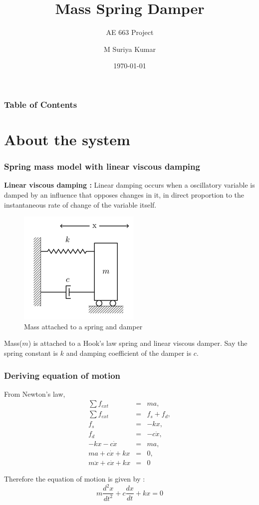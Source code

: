 \documentclass[10pt]{beamer}
\title{Mass Spring Damper}
\subtitle{AE 663 Project}
\institute{Indian Institute of Technology Bombay}
\author{M Suriya Kumar}
\date{\today}
\begin{document}
\begin{frame}[plain]
\maketitle
\end{frame}

\begin{frame}
\frametitle{Table of Contents}
\tableofcontents 
\end{frame}

\section{About the system}

\begin{frame}
\frametitle{Spring mass model with linear viscous damping}
\textbf{Linear viscous damping\cite{wiki} :} Linear damping occurs when a oscillatory variable is damped 
by an influence that opposes changes in it, in direct proportion to the instantaneous rate of change 
of the variable itself.

\begin{figure}[h]
\includegraphics[scale=0.5]{spring_mass_damper.png}
\caption{Mass attached to a spring and damper}
\centering
\end{figure}

Mass($m$) is attached to a Hook's law spring and linear viscous damper. Say the spring constant 
is $k$ and damping coefficient of the damper is $c$.
\end{frame}

\begin{frame}
\frametitle{Deriving equation of motion}
From Newton's law, 
\begin{eqnarray*}
\sum f_{ext} &=& ma, \\
\sum f_{ext} &=& f_s + f_d, \\
f_s &=& -kx, 	\\
f_d &=& -c\dot{x}, \\
-kx - c\dot{x} &=& ma, \\
ma + c\dot{x} + kx &=& 0, \\
m\ddot{x} + c\dot{x} + kx &=& 0
\end{eqnarray*}

Therefore the equation of motion is given by :
\begin{equation}
m\frac{d^2x}{dt^2} + c\frac{dx}{dt} + kx = 0
\label{eom}
\end{equation}
\end{frame}
\end{document}
